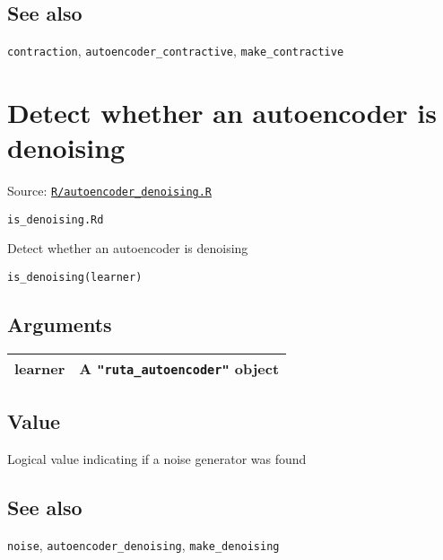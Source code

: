 \hypertarget{see-also}{\subsection{\texorpdfstring{\protect\hyperlink{see-also}{}See
also}{See also}}\label{see-also}}

\texttt{contraction}, \texttt{autoencoder\_contractive},
\texttt{make\_contractive}

\section{Detect whether an autoencoder is
denoising}\label{detect-whether-an-autoencoder-is-denoising}

Source:
\href{https://github.com/fdavidcl/ruta/blob/master/R/autoencoder_denoising.R}{\texttt{R/autoencoder\_denoising.R}}

\texttt{is\_denoising.Rd}

Detect whether an autoencoder is denoising

\begin{verbatim}
is_denoising(learner)
\end{verbatim}

\hypertarget{arguments}{\subsection{\texorpdfstring{\protect\hyperlink{arguments}{}Arguments}{Arguments}}\label{arguments}}

\begin{longtable}[c]{@{}ll@{}}
\toprule
learner & A \texttt{"ruta\_autoencoder"} object\tabularnewline
\bottomrule
\end{longtable}

\hypertarget{value}{\subsection{\texorpdfstring{\protect\hyperlink{value}{}Value}{Value}}\label{value}}

Logical value indicating if a noise generator was found

\hypertarget{see-also}{\subsection{\texorpdfstring{\protect\hyperlink{see-also}{}See
also}{See also}}\label{see-also}}

\texttt{noise}, \texttt{autoencoder\_denoising},
\texttt{make\_denoising}

